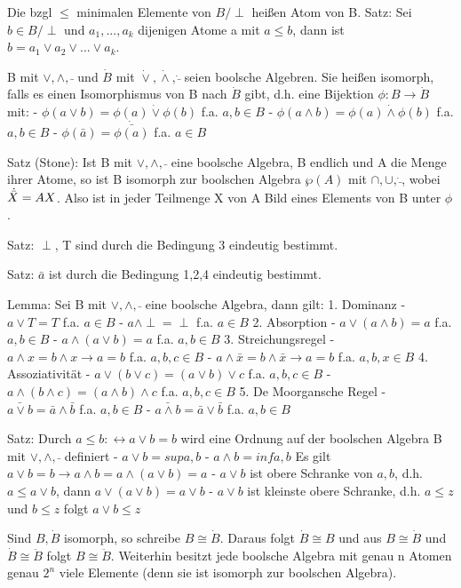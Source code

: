 \documentclass[10pt,landscape]{article}
\begin{document}
\begin{multicols}{3}
{{Die bzgl $\leq$ minimalen Elemente von $B /\perp$ heißen Atom von B.
Satz: Sei $b\in B /\perp$ und $a_1,...,a_k$ dijenigen Atome a mit $a\leq b$, dann ist $b= a_1 \vee a_2 \vee ... \vee a_k$.

B mit $\vee, \wedge, \bar{ }$ und $\dot{B}$ mit $\dot{\vee}, \dot{\wedge}, \dot{\bar{}}$ seien boolsche Algebren. Sie heißen isomorph, falls es einen Isomorphismus von B nach $\dot{B}$ gibt, d.h. eine Bijektion $\phi: B \rightarrow \dot{B}$ mit:
- $\phi(a\vee b) =\phi(a)\dot{\vee}\phi(b)$ f.a. $a,b \in B$
- $\phi(a\wedge b)=\phi(a)\dot{\wedge}\phi(b)$ f.a. $a,b\in B$
- $\phi(\bar{a}) = \dot{\bar{\phi(a)}}$ f.a. $a\in B$

Satz (Stone): Ist B mit $\vee, \wedge, \bar{}$ eine boolsche Algebra, B endlich und A die Menge ihrer Atome, so ist B isomorph zur boolschen Algebra $\wp(A)$ mit $\cap,\cup,\dot{\bar{}}$, wobei $\dot{\bar{X}}=A\\X$.
Also ist in jeder Teilmenge X von A Bild eines Elements von B unter $\phi$.

Satz: $\perp$, T sind durch die Bedingung 3 eindeutig bestimmt.

Satz: $\bar{a}$ ist durch die Bedingung 1,2,4 eindeutig bestimmt.

Lemma: Sei B mit $\vee, \wedge, \bar{}$ eine boolsche Algebra, dann gilt:
1. Dominanz
    - $a\vee T = T$ f.a. $a\in B$
    - $a\wedge \perp = \perp$ f.a. $a\in B$
2. Absorption
    - $a\vee(a\wedge b)= a$ f.a. $a,b\in B$
    - $a\wedge(a\vee b)= a$ f.a. $a,b\in B$
3. Streichungsregel
    - $a\wedge x = b\wedge x \rightarrow a=b$ f.a. $a,b,c \in B$
    - $a\wedge \bar{x} = b\wedge\bar{x} \rightarrow a=b$ f.a. $a,b,x \in B$
4. Assoziativität
    - $a\vee(b\vee c)=(a\vee b)\vee c$ f.a. $a,b,c\in B$
    - $a\wedge(b\wedge c)=(a\wedge b)\wedge c$ f.a. $a,b,c \in B$
5. De Moorgansche Regel
    - $\bar{a\vee b} = \bar{a}\wedge \bar{b}$ f.a. $a,b\in B$
    - $\bar{a\wedge b} = \bar{a}\vee \bar{b}$ f.a. $a,b\in B$

Satz: Durch $a\leq b:\leftrightarrow a\vee b=b$ wird eine Ordnung auf der boolschen Algebra B mit $\vee, \wedge, \bar{}$ definiert
- $a\vee b = sup{a,b}$
- $a\wedge b = inf{a,b}$
Es gilt $a\vee b= b \rightarrow a\wedge b = a\wedge(a\vee b)= a$
- $a\vee b$ ist obere Schranke von ${a,b}$, d.h. $a\leq a\vee b$, dann $a\vee(a\vee b)=a\vee b$
- $a\vee b$ ist kleinste obere Schranke, d.h. $a\leq z$ und $b\leq z$ folgt $a\vee b \leq z$

Sind $B, \dot{B}$ isomorph, so schreibe $B \cong \dot{B}$. Daraus folgt $\dot{B} \cong B$ und aus $B \cong \dot{B}$ und $\dot{B} \cong \ddot{B}$ folgt $B \cong \ddot{B}$.
Weiterhin besitzt jede boolsche Algebra mit genau n Atomen genau $2^n$ viele Elemente (denn sie ist isomorph zur boolschen Algebra).

}}
\end{multicols}
\end{document}
